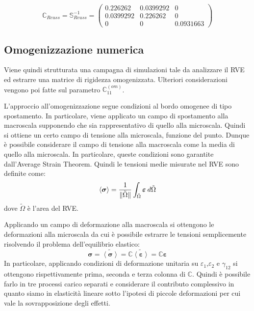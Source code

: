 \documentclass[a4paper,num-refs]{oup-contemporary}
\begin{document}
\begin{equation}
	\mathbb C_{Reuss}=\mathbb S_{Reuss}^{-1}=\begin{pmatrix}
0.226262&0.0399292&0\\
0.0399292&0.226262&0\\
0&0&0.0931663
	\end{pmatrix}
\end{equation}


\subsection{Omogenizzazione numerica}
\label{sec:homogen}

Viene quindi strutturata una campagna di simulazioni tale da analizzare il RVE ed estrarre una matrice di rigidezza omogenizzata. Ulteriori considerazioni vengono poi fatte sul parametro $\mathbb C_{11}^{(om)}$.

L'approccio all'omogenizzazione segue condizioni al bordo omogenee di tipo spostamento.  
In particolare, viene applicato un campo di spostamento alla macroscala supponendo che sia rappresentativo di quello alla microscala. Quindi si ottiene un certo campo di tensione alla microscala, funzione del punto. Dunque è possibile considerare il campo di tensione alla macroscala come la media di quello alla microscala. In particolare, queste condizioni sono garantite dall'Average Strain Theorem.
Quindi le tensioni medie misurate nel RVE sono definite come:
\begin{equation}
	\left< \boldsymbol{\sigma}\right> ={1\over \|\tilde \Omega\|}\int _{\tilde \Omega} \boldsymbol{\varepsilon} \:d\tilde \Omega
\end{equation}
dove $\tilde \Omega$ è l'area del RVE.

Applicando un campo di deformazione alla macroscala si ottengono le deformazioni alla microscala da cui è possibile estrarre le tensioni semplicemente risolvendo il problema dell'equilibrio elastico:
\begin{equation}
\boldsymbol{\sigma}=\tilde{\left<{\boldsymbol{\sigma}}\right>}=\mathbb C\tilde{\left<{\boldsymbol{\varepsilon}}\right>}=\mathbb C \boldsymbol{\varepsilon}
\end{equation}
In particolare, applicando condizioni di deformazione unitaria su $\varepsilon_1$,$\varepsilon_2$ e $\gamma_{12}$ si ottengono rispettivamente prima, seconda e terza colonna di $\mathbb C$. Quindi è possibile farlo in tre processi carico separati e considerare il contributo complessivo in quanto siamo in elasticità lineare sotto l'ipotesi di piccole deformazioni per cui vale la sovrapposizione degli effetti.
\end{document}
